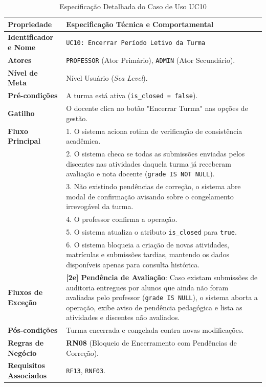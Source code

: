 \begin{table}[!ht]
\centering
\caption{Especificação Detalhada do Caso de Uso UC10}
\label{tab_uc10}
\footnotesize
\begin{tabularx}{\textwidth}{p{3.5cm} X}
\toprule
\textbf{Propriedade} & \textbf{Especificação Técnica e Comportamental} \\
\midrule
\textbf{Identificador e Nome} & \texttt{UC10: Encerrar Período Letivo da Turma} \\
\textbf{Atores} & \texttt{PROFESSOR} (Ator Primário), \texttt{ADMIN} (Ator Secundário). \\
\textbf{Nível de Meta} & Nível Usuário (\textit{Sea Level}). \\
\textbf{Pré-condições} & A turma está ativa (\texttt{is\_closed = false}). \\
\textbf{Gatilho} & O docente clica no botão "Encerrar Turma" nas opções de gestão. \\
\textbf{Fluxo Principal} & 
1. O sistema aciona rotina de verificação de consistência acadêmica.\\
& 2. O sistema checa se todas as submissões enviadas pelos discentes nas atividades daquela turma já receberam avaliação e nota docente (\texttt{grade IS NOT NULL}).\\
& 3. Não existindo pendências de correção, o sistema abre modal de confirmação avisando sobre o congelamento irrevogável da turma.\\
& 4. O professor confirma a operação.\\
& 5. O sistema atualiza o atributo \texttt{is\_closed} para \texttt{true}.\\
& 6. O sistema bloqueia a criação de novas atividades, matrículas e submissões tardias, mantendo os dados disponíveis apenas para consulta histórica. \\
\textbf{Fluxos de Exceção} & 
\textbf{[2e] Pendência de Avaliação}: Caso existam submissões de auditoria entregues por alunos que ainda não foram avaliadas pelo professor (\texttt{grade IS NULL}), o sistema aborta a operação, exibe aviso de pendência pedagógica e lista as atividades e discentes não avaliados. \\
\textbf{Pós-condições} & Turma encerrada e congelada contra novas modificações. \\
\textbf{Regras de Negócio} & \textbf{RN08} (Bloqueio de Encerramento com Pendências de Correção). \\
\textbf{Requisitos Associados} & \texttt{RF13}, \texttt{RNF03}. \\
\bottomrule
\end{tabularx}
\end{table}
